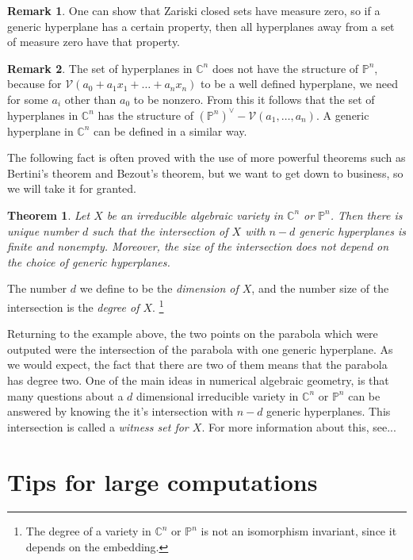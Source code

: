\documentclass[12pt]{article}
\newtheorem{theorem}{Theorem}[section]
\theoremstyle{definition}
\newtheorem{remark}{Remark}[section]
\newcommand{\C}{\mathbb{C}}
\newcommand{\PP}{\mathbb{P}}
\begin{document}
\begin{remark}
   One can show that Zariski closed sets have measure zero, so if a 
   generic hyperplane has a certain property, then all hyperplanes away 
   from a set of measure zero have that property.
\end{remark}
\begin{remark}
   The set of hyperplanes in $\C^n$ does not have the structure of 
   $\PP^n$, because for $\mathcal{V}(a_0 + a_1x_1 + \ldots + a_nx_n)$ to 
   be a well defined hyperplane, we need for some $a_i$ other than $a_0$ 
   to be nonzero. From this it follows that the set of hyperplanes in 
   $\C^n$ has the structure of $(\PP^n)^\vee - \mathcal{V}(a_1, \ldots, 
   a_n)$. A generic hyperplane in $\C^n$ can be defined in a similar 
   way.
\end{remark}

The following fact is often proved with the use of more powerful 
theorems such as Bertini's theorem and Bezout's theorem, but we want to 
get down to business, so we will take it for granted.

\begin{theorem}
   Let $X$ be an irreducible algebraic variety in $\C^n$ or $\PP^n$. 
   Then there is unique number $d$ such that the intersection of $X$ 
   with $n-d$ generic hyperplanes is finite and nonempty. Moreover, the 
   size of the intersection does not depend on the choice of generic 
   hyperplanes.
\end{theorem}

The number $d$ we define to be the \emph{dimension of $X$}, and the number size 
of the intersection is the \emph{degree of $X$}. \footnote{The degree of 
a variety in $\C^n$ or $\PP^n$ is not an isomorphism invariant, since it 
depends on the embedding.}

Returning to the example above, the two points on the parabola which 
were outputed were the intersection of the parabola with one generic 
hyperplane. As we would expect, the fact that there are two of them 
means that the parabola has degree two. One of the main ideas 
in numerical algebraic geometry, is that many questions about a $d$ 
dimensional irreducible variety in $\C^n$ or $\PP^n$ can be answered by knowing the 
it's intersection with $n-d$ generic hyperplanes. This intersection is 
called a \emph{witness set for $X$}. For more information 
about this, see...

\section{Tips for large computations}
\end{document}
